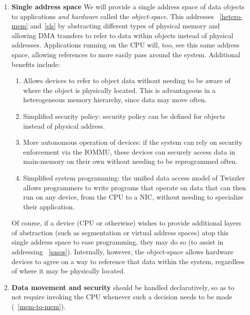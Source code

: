 {\begin{enumerate}
            \item \textbf{Single address space} We will provide a single address space of data objects to
                  applications \emph{and hardware} called the \emph{object-space}. This addresses
                  \observations~\ref{hetero-mem} and~\ref{sls} by abstracting
                  different types of physical memory and allowing DMA transfers to refer to data within
                  objects instead of physical addresses. Applications running on the CPU will, too, see this
                  same address space, allowing references to more easily pass around the system. Additional
                  benefits include:
                  \begin{enumerate}
                      \item Allows devices to refer to object data without needing to be aware of where the
                            object is physically located. This is advantageous in a heterogeneous memory
                            hierarchy, since data may move often.
                      \item Simplified security policy: security policy can be defined for objects instead of
                            physical address.
                      \item More autonomous operation of devices: if the system can rely on security
                            enforcement via the IOMMU, these devices can securely access data in main-memory on
                            their own without needing to be reprogrammed often.
                      \item Simplified system programming: the unified data access model of Twizzler allows
                            programmers to write programs that operate on data
                            that can then run on any device, from the CPU to a NIC, without needing to
                            specialize their application.
                  \end{enumerate}
                  Of course, if a device (CPU or otherwise) wishes to provide additional layers of abstraction
                  (such as segmentation or virtual address spaces) atop this single address space to ease
                  programming, they may do so (to assist in addressing \observation~\ref{sasos}). Internally, however, the object-space allows hardware devices
                  to agree on a way to reference that data within the system, regardless of where it may be
                  physically located.
            \item \textbf{Data movement and security} should be handled declaratively, so as to not require invoking
                  the CPU whenever such a decision needs to be made (\observation~\ref{mem-to-mem}).
        \end{enumerate}
    }

